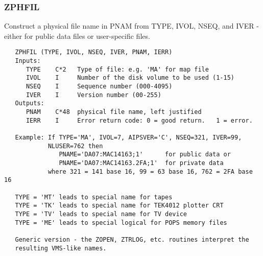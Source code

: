 \subsubsection{ZPHFIL}
Construct a physical file name in PNAM from TYPE, IVOL, NSEQ, and
IVER - either for public data files or user-specific files.
\begin{verbatim}
   ZPHFIL (TYPE, IVOL, NSEQ, IVER, PNAM, IERR)
   Inputs:
      TYPE    C*2   Type of file: e.g. 'MA' for map file
      IVOL    I     Number of the disk volume to be used (1-15)
      NSEQ    I     Sequence number (000-4095)
      IVER    I     Version number (00-255)
   Outputs:
      PNAM    C*48  physical file name, left justified
      IERR    I     Error return code: 0 = good return.   1 = error.

   Example: If TYPE='MA', IVOL=7, AIPSVER='C', NSEQ=321, IVER=99,
            NLUSER=762 then
               PNAME='DA07:MAC14163;1'      for public data or
               PNAME='DA07:MAC14163.2FA;1'  for private data
            where 321 = 141 base 16, 99 = 63 base 16, 762 = 2FA base 16

   TYPE = 'MT' leads to special name for tapes
   TYPE = 'TK' leads to special name for TEK4012 plotter CRT
   TYPE = 'TV' leads to special name for TV device
   TYPE = 'ME' leads to special logical for POPS memory files

   Generic version - the ZOPEN, ZTRLOG, etc. routines interpret the
   resulting VMS-like names.
\end{verbatim}

